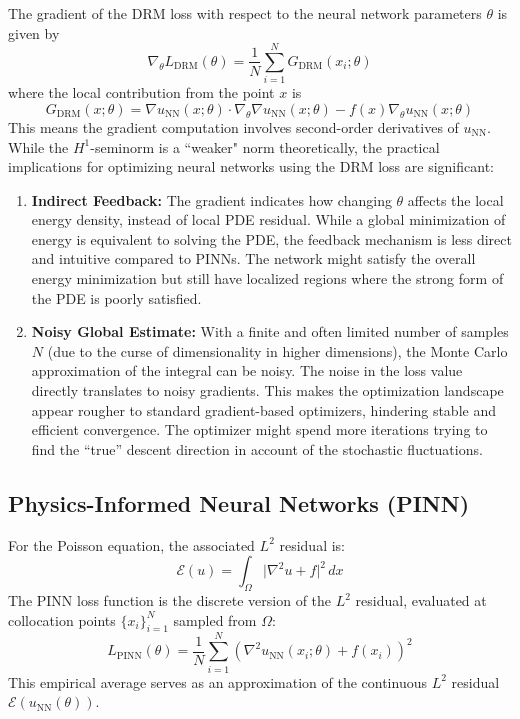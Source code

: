 \documentclass{article}
\begin{document}
The gradient of the DRM loss with respect to the neural network parameters $\theta$ is given by
$$ \nabla_{\theta} L_{\text{DRM}}(\theta) = \frac{1}{N} \sum_{i=1}^N G_{\text{DRM}}(x_i; \theta)$$
where the local contribution from the point $x$ is
\begin{equation}
G_{\text{DRM}}(x; \theta) = \nabla u_{\text{NN}}(x; \theta) \cdot \nabla_{\theta} \nabla u_{\text{NN}}(x; \theta) - f(x) \nabla_{\theta} u_{\text{NN}}(x; \theta)
\end{equation}
This means the gradient computation involves second-order derivatives of $u_{\text{NN}}$.
While the $H^1$-seminorm is a ``weaker" norm theoretically, the practical implications for optimizing neural networks using the DRM loss are significant:
\begin{enumerate}
\item \textbf{Indirect Feedback:} The gradient indicates how changing $\theta$ affects the local energy density, instead of local PDE residual. While a global minimization of energy is equivalent to solving the PDE, the feedback mechanism is less direct and intuitive compared to PINNs. The network might satisfy the overall energy minimization but still have localized regions where the strong form of the PDE is poorly satisfied.
\item \textbf{Noisy Global Estimate:} With a finite and often limited number of samples $N$ (due to the curse of dimensionality in higher dimensions), the Monte Carlo approximation of the integral can be noisy. The noise in the loss value directly translates to noisy gradients. This makes the optimization landscape appear rougher to standard gradient-based optimizers, hindering stable and efficient convergence. The optimizer might spend more iterations trying to find the ``true'' descent direction in account of the stochastic fluctuations.
\end{enumerate}


\subsection{Physics-Informed Neural Networks (PINN)}

For the Poisson equation, the associated $L^2$ residual is:
$$\mathcal{E}(u) = \int_{\Omega} \vert \nabla^2 u + f \vert^2 \, dx$$
The PINN loss function is the discrete version of the $L^2$ residual, evaluated at collocation points $\{x_i\}_{i=1}^N$ sampled from $\Omega$:
$$L_{\text{PINN}}(\theta) = \frac{1}{N} \sum_{i=1}^{N} \left(\nabla^2 u_{\text{NN}}(x_i; \theta) + f(x_i) \right)^2$$
This empirical average serves as an approximation of the continuous $L^2$ residual $\mathcal{E}(u_{\text{NN}}(\theta))$.
\end{document}
